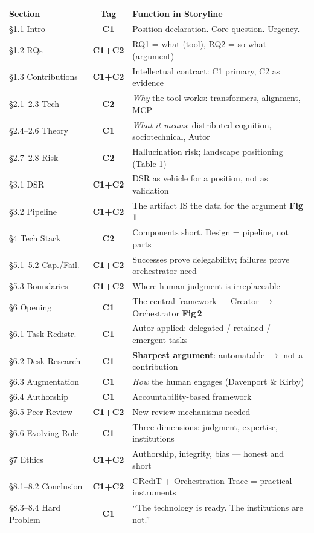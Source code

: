 \documentclass[11pt,a4paper]{article}
\newcommand{\ctag}[2]{\colorbox{#1}{\small\color{white}\textbf{#2}}}
\newcommand{\Cone}{\ctag{c1color}{C1}}
\newcommand{\Ctwo}{\ctag{c2color}{C2}}
\newcommand{\Cboth}{\ctag{bothcolor}{C1+C2}}
\newcommand{\figref}[1]{{\scriptsize\color{figcolor}\textbf{Fig\,#1}}}
\begin{document}
\renewcommand{\arraystretch}{1.12}
{\small
\begin{tabularx}{\textwidth}{@{} l c X @{}}
\toprule
\textbf{Section} & \textbf{Tag} & \textbf{Function in Storyline} \\
\midrule
\S1.1 Intro & \Cone & Position declaration. Core question. Urgency. \\
\S1.2 RQs & \Cboth & RQ1 = what (tool), RQ2 = so what (argument) \\
\S1.3 Contributions & \Cboth & Intellectual contract: C1 primary, C2 as evidence \\
\midrule
\S2.1--2.3 Tech & \Ctwo & \textit{Why} the tool works: transformers, alignment, MCP \\
\S2.4--2.6 Theory & \Cone & \textit{What it means}: distributed cognition, sociotechnical, Autor \\
\S2.7--2.8 Risk & \Ctwo & Hallucination risk; landscape positioning (Table 1) \\
\midrule
\S3.1 DSR & \Cboth & DSR as vehicle for a position, not as validation \\
\S3.2 Pipeline & \Cboth & The artifact IS the data for the argument \hfill \figref{1} \\
\midrule
\S4 Tech Stack & \Ctwo & Components short. Design = pipeline, not parts \\
\S5.1--5.2 Cap./Fail. & \Cboth & Successes prove delegability; failures prove orchestrator need \\
\S5.3 Boundaries & \Cboth & Where human judgment is irreplaceable \\
\midrule
\S6 Opening & \Cone & The central framework --- Creator $\to$ Orchestrator \hfill \figref{2} \\
\S6.1 Task Redistr. & \Cone & Autor applied: delegated / retained / emergent tasks \\
\S6.2 Desk Research & \Cone & \textbf{Sharpest argument}: automatable $\rightarrow$ not a contribution \\
\S6.3 Augmentation & \Cone & \textit{How} the human engages (Davenport \& Kirby) \\
\S6.4 Authorship & \Cone & Accountability-based framework \\
\S6.5 Peer Review & \Cboth & New review mechanisms needed \\
\S6.6 Evolving Role & \Cone & Three dimensions: judgment, expertise, institutions \\
\midrule
\S7 Ethics & \Cboth & Authorship, integrity, bias --- honest and short \\
\S8.1--8.2 Conclusion & \Cboth & CRediT + Orchestration Trace = practical instruments \\
\S8.3--8.4 Hard Problem & \Cone & ``The technology is ready. The institutions are not.'' \\
\bottomrule
\end{tabularx}
}
\end{document}
